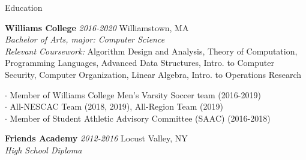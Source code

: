 \documentclass{resume} %
\begin{document}

\begin{rSection}{Education}

{\bf Williams College}  {\textit{ 2016-2020}} \hfill Williamstown, MA \\ 
\textit{ Bachelor of Arts, major: Computer Science }\\
\textit{Relevant Coursework:} Algorithm Design and Analysis, Theory of Computation, Programming Languages, Advanced Data Structures, Intro. to Computer Security, Computer Organization, Linear Algebra, Intro. to Operations Research 

$\cdot$ Member of Williams College Men’s Varsity Soccer team (2016-2019) \\
$\cdot$ All-NESCAC Team (2018, 2019), All-Region Team (2019) \\
$\cdot$  Member of Student Athletic Advisory Committee (SAAC) (2016-2018)

\vspace{0.2mm}
{\bf Friends Academy} {\textit{ 2012-2016}}  \hfill Locust Valley, NY\\ 
{\em High School Diploma } 

\end{rSection}
\end{document}
